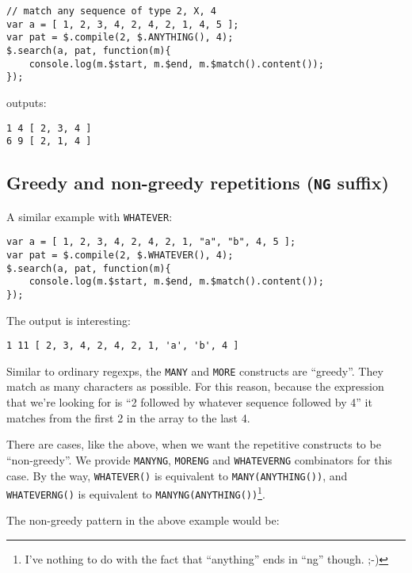 \documentclass[a4paper,10pt]{article}
\begin{document}
\begin{verbatim}
// match any sequence of type 2, X, 4
var a = [ 1, 2, 3, 4, 2, 4, 2, 1, 4, 5 ];
var pat = $.compile(2, $.ANYTHING(), 4);
$.search(a, pat, function(m){
    console.log(m.$start, m.$end, m.$match().content());
});
\end{verbatim}

outputs:


\begin{verbatim}
1 4 [ 2, 3, 4 ]
6 9 [ 2, 1, 4 ]
\end{verbatim}
\subsection{Greedy and non-greedy repetitions (\texttt{NG} suffix)}
\label{sec-2-3}


A similar example with \texttt{WHATEVER}:


\begin{verbatim}
var a = [ 1, 2, 3, 4, 2, 4, 2, 1, "a", "b", 4, 5 ];
var pat = $.compile(2, $.WHATEVER(), 4);
$.search(a, pat, function(m){
    console.log(m.$start, m.$end, m.$match().content());
});
\end{verbatim}

The output is interesting:


\begin{verbatim}
1 11 [ 2, 3, 4, 2, 4, 2, 1, 'a', 'b', 4 ]
\end{verbatim}

Similar to ordinary regexps, the \texttt{MANY} and \texttt{MORE} constructs are “greedy”.
They match as many characters as possible.  For this reason, because the
expression that we're looking for is “2 followed by whatever sequence
followed by 4” it matches from the first 2 in the array to the last 4.

There are cases, like the above, when we want the repetitive constructs to
be “non-greedy”.  We provide \texttt{MANYNG}, \texttt{MORENG} and \texttt{WHATEVERNG} combinators
for this case.  By the way, \texttt{WHATEVER()} is equivalent to
\texttt{MANY(ANYTHING())}, and \texttt{WHATEVERNG()} is equivalent to
\texttt{MANYNG(ANYTHING())}\footnote{I've nothing to do with the fact that “anything” ends in “ng”
though. ;-) }.

The non-greedy pattern in the above example would be:
\end{document}
